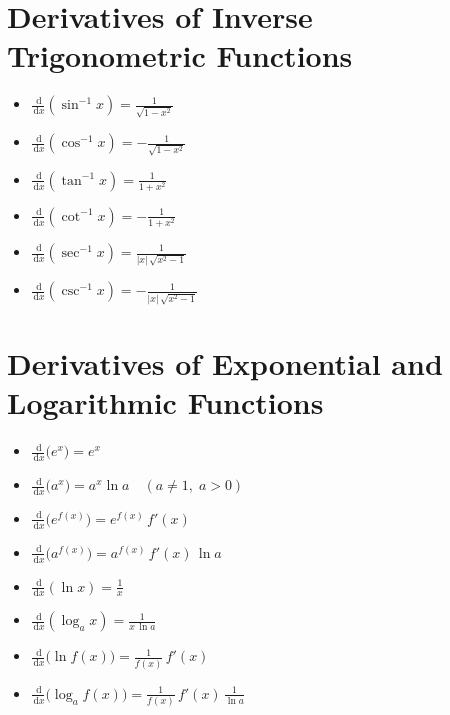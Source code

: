 \documentclass[12pt]{article}
\newcommand{\dd}{\, \mathrm{d}}
\begin{document}
\section*{Derivatives of Inverse Trigonometric Functions}
\begin{itemize}
    \item $\displaystyle \frac{\dd}{\dd x}(\sin^{-1}x) = \frac{1}{\sqrt{1 - x^{2}}}$
    \item $\displaystyle \frac{\dd}{\dd x}(\cos^{-1}x) = -\frac{1}{\sqrt{1 - x^{2}}}$
    \item $\displaystyle \frac{\dd}{\dd x}(\tan^{-1}x) = \frac{1}{1 + x^{2}}$
    \item $\displaystyle \frac{\dd}{\dd x}(\cot^{-1}x) = -\frac{1}{1 + x^{2}}$
    \item $\displaystyle \frac{\dd}{\dd x}(\sec^{-1}x) = \frac{1}{|x|\,\sqrt{x^{2} - 1}}$
    \item $\displaystyle \frac{\dd}{\dd x}(\csc^{-1}x) = -\frac{1}{|x|\,\sqrt{x^{2} - 1}}$
\end{itemize}

\section*{Derivatives of Exponential and Logarithmic Functions}
\begin{itemize}
    \item $\displaystyle \frac{\dd}{\dd x}\bigl(e^{x}\bigr) = e^{x}$
    \item $\displaystyle \frac{\dd}{\dd x}\bigl(a^{x}\bigr) = a^{x} \ln a \quad (a \ne 1,\; a > 0)$
    \item $\displaystyle \frac{\dd}{\dd x}\bigl(e^{f(x)}\bigr) = e^{f(x)}\, f'(x)$
    \item $\displaystyle \frac{\dd}{\dd x}\bigl(a^{f(x)}\bigr) = a^{f(x)}\, f'(x)\, \ln a$
    \item $\displaystyle \frac{\dd}{\dd x}(\ln x) = \frac{1}{x}$
    \item $\displaystyle \frac{\dd}{\dd x}(\log_{a} x) = \frac{1}{x\,\ln a}$
    \item $\displaystyle \frac{\dd}{\dd x}\bigl(\ln f(x)\bigr) = \frac{1}{f(x)}\, f'(x)$
    \item $\displaystyle \frac{\dd}{\dd x}\bigl(\log_{a} f(x)\bigr) = \frac{1}{f(x)}\, f'(x)\, \frac{1}{\ln a}$
\end{itemize}
\end{document}

